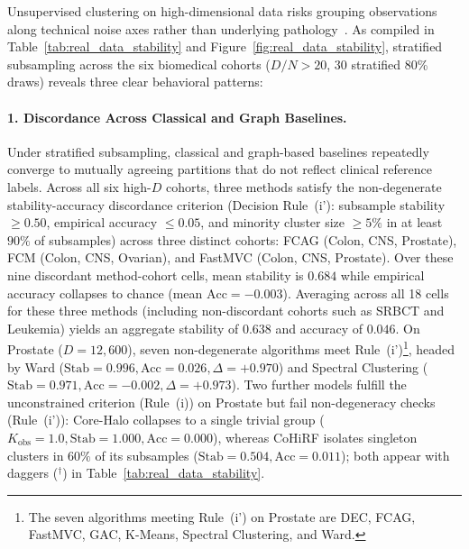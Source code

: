 \documentclass[pdflatex,sn-mathphys-num]{sn-jnl}
\theoremstyle{thmstyleone}
\theoremstyle{thmstyletwo}
\theoremstyle{thmstylethree}
\begin{document}


Unsupervised clustering on high-dimensional data risks grouping observations along technical noise axes rather than underlying pathology~\cite{jahanian2026highdim}. As compiled in Table~\ref{tab:real_data_stability} and Figure~\ref{fig:real_data_stability}, stratified subsampling across the six biomedical cohorts ($D/N > 20$, 30 stratified 80\% draws) reveals three clear behavioral patterns:

\paragraph{1. Discordance Across Classical and Graph Baselines.}
Under stratified subsampling, classical and graph-based baselines repeatedly converge to mutually agreeing partitions that do not reflect clinical reference labels. Across all six high-$D$ cohorts, three methods satisfy the non-degenerate stability-accuracy discordance criterion (Decision Rule~(i'): subsample stability $\ge 0.50$, empirical accuracy $\le 0.05$, and minority cluster size $\ge 5\%$ in at least $90\%$ of subsamples) across three distinct cohorts: FCAG (Colon, CNS, Prostate), FCM (Colon, CNS, Ovarian), and FastMVC (Colon, CNS, Prostate). Over these nine discordant method-cohort cells, mean stability is $0.684$ while empirical accuracy collapses to chance (mean $\text{Acc} = -0.003$). Averaging across all 18 cells for these three methods (including non-discordant cohorts such as SRBCT and Leukemia) yields an aggregate stability of $0.638$ and accuracy of $0.046$. On Prostate ($D=12{,}600$), seven non-degenerate algorithms meet Rule~(i')\footnote{The seven algorithms meeting Rule~(i') on Prostate are DEC, FCAG, FastMVC, GAC, K-Means, Spectral Clustering, and Ward.}, headed by Ward ($\text{Stab}=0.996, \text{Acc}=0.026, \Delta=+0.970$) and Spectral Clustering ($\text{Stab}=0.971, \text{Acc}=-0.002, \Delta=+0.973$). Two further models fulfill the unconstrained criterion (Rule~(i)) on Prostate but fail non-degeneracy checks (Rule~(i')): Core-Halo collapses to a single trivial group ($K_{\text{obs}}=1.0, \text{Stab}=1.000, \text{Acc}=0.000$), whereas CoHiRF isolates singleton clusters in $60\%$ of its subsamples ($\text{Stab}=0.504, \text{Acc}=0.011$); both appear with daggers ($^\dagger$) in Table~\ref{tab:real_data_stability}.
\end{document}
